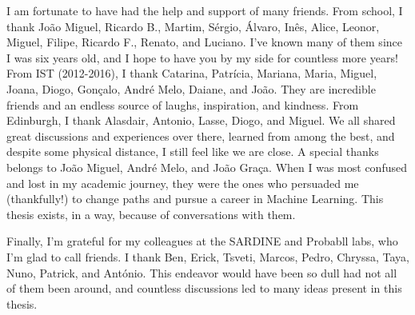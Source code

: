 \begin{acknowledgments}
    I am fortunate to have had the help and support of many friends.
    From school, I thank João Miguel, Ricardo B., Martim, Sérgio,
    Álvaro, Inês, Alice, Leonor, Miguel, Filipe, Ricardo F., Renato,
    and Luciano. I've known many of them since I was six years old,
    and I hope to have you by my side for countless more years! From
    IST (2012-2016), I thank Catarina, Patrícia, Mariana, Maria,
    Miguel, Joana, Diogo, Gonçalo, André Melo, Daiane, and João. They are
    incredible friends and an endless source of laughs, inspiration,
    and kindness. From Edinburgh, I thank Alasdair, Antonio, Lasse,
    Diogo, and Miguel. We all shared great discussions and
    experiences over there, learned from among the best, and despite
    some physical distance, I still feel like we are
    close. A special thanks belongs to João Miguel, André Melo, and
    João Graça. When I was most confused and lost in my academic
    journey, they were the ones who persuaded me (thankfully!) to
    change paths and pursue a career in Machine Learning. This thesis
    exists, in a way, because of conversations with them.
    
    Finally, I'm grateful for my colleagues at the SARDINE and
    Probabll labs, who I'm glad to call friends. I thank Ben, Erick,
    Tsveti, Marcos, Pedro, Chryssa, Taya, Nuno, Patrick, and António.
    This endeavor would have been so dull had not all of them been
    around, and countless discussions led to many ideas present in
    this thesis.
    
\end{acknowledgments}
\clearpage
\thispagestyle{empty}
\cleardoublepage
\singlespacing
{}